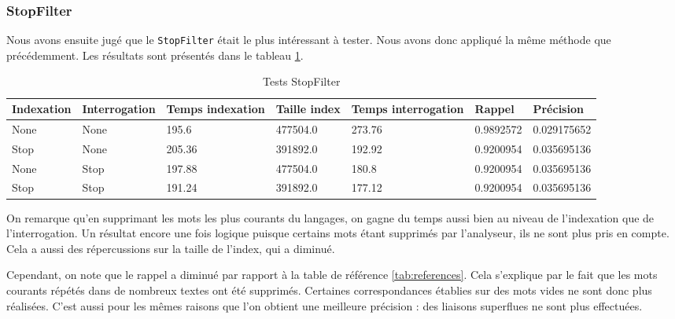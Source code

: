 \subsubsection{StopFilter}

Nous avons ensuite jugé que le \texttt{StopFilter} était le plus intéressant à tester. Nous avons donc appliqué la même méthode que précédemment. Les résultats sont présentés dans le tableau \ref{tab:tests_StopFilter}.

\begin{table}[!htbp]
    \hspace{-2cm}
                \begin{tabular}{|p{2.5cm}|p{2.5cm}|p{2cm}|p{2cm}|p{2.5cm}|p{2cm}|p{2cm}|}
                    \hline
                    \textbf{Indexation} & \textbf{Interrogation} & \textbf{Temps \mbox{indexation}} & \textbf{Taille \mbox{index}} & \textbf{Temps \mbox{interrogation}} & \textbf{Rappel} & \textbf{Précision}\\
                    \hline
                    None & None & 195.6 & 477504.0 & 273.76 & 0.9892572 & 0.029175652\\
                    \hline
Stop & None & 205.36 & 391892.0 & 192.92 & 0.9200954 & 0.035695136\\
		\hline
None & Stop & 197.88 & 477504.0 & 180.8 & 0.9200954 & 0.035695136\\
		\hline
Stop & Stop & 191.24 & 391892.0 & 177.12 & 0.9200954 & 0.035695136\\
                    \hline
                \end{tabular}
                \caption{Tests StopFilter}
                \label{tab:tests_StopFilter}
            \end{table}

On remarque qu’en supprimant les mots les plus courants du langages, on gagne du temps aussi bien au niveau de l’indexation que de l’interrogation. Un résultat encore une fois logique puisque certains mots étant supprimés par l'analyseur, ils ne sont plus pris en compte. Cela a aussi des répercussions sur la taille de l’index, qui a diminué.
	
Cependant, on note que le rappel a diminué par rapport à la table de référence \ref{tab:references}. Cela s’explique par le fait que les mots courants répétés dans de nombreux textes ont été supprimés. Certaines correspondances établies sur des mots vides ne sont donc plus réalisées. C’est aussi pour les mêmes raisons que l’on obtient une meilleure précision : des liaisons superflues ne sont plus effectuées.

